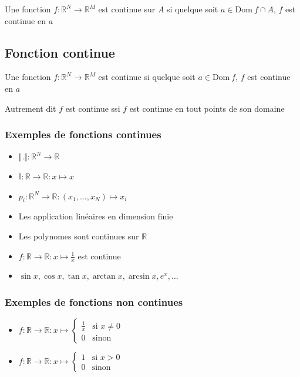 \documentclass[a4paper,10pt]{article}
\newcommand{\ap}{\rightarrow}
\newcommand{\Dom}{\mathrm{Dom}\:}
\newcommand{\R}{\mathbb{R}}
\begin{document}
Une fonction $f: \R^N \ap \R^M$ est continue sur $A$ si quelque soit $a \in \Dom f \cap A$, $f$ est continue en $a$

\subsection{Fonction continue}

Une fonction $f: \R^N \ap \R^M$ est continue si quelque soit $a \in \Dom f$, $f$ est continue en $a$

Autrement dit $f$ est continue ssi $f$ est continue en tout points de son domaine

\subsubsection{Exemples de fonctions continues}

\begin{itemize}
	\item{$\Vert . \Vert : \R^N \ap \R$}
	\item{$\mathbb{I} : \R \ap \R : x \mapsto x$}
	\item{$p_i : \R^N \ap \R : (x_1, \dots, x_N) \mapsto x_i$}
	\item{Les application linéaires en dimension finie}
	\item{Les polynomes sont continues sur $\R$}
	\item{$f : \R \ap \R : x \mapsto \frac{1}{x}$ est continue}
	\item{$\sin x, \cos x, \tan x, \arctan x, \arcsin x, e^x, \dots $}
\end{itemize}

\subsubsection{Exemples de fonctions non continues}

\begin{itemize}
	\item{$f: \R \ap \R : x \mapsto \begin{cases} \frac{1}{x} & \mbox{si } x \neq 0 \\ 0 & \mbox{sinon} \end{cases}$}
	\item{$f: \R \ap \R : x \mapsto \begin{cases} 1 & \mbox{si } x > 0 \\ 0 & \mbox{sinon} \end{cases}$}
\end{itemize}
\end{document}
